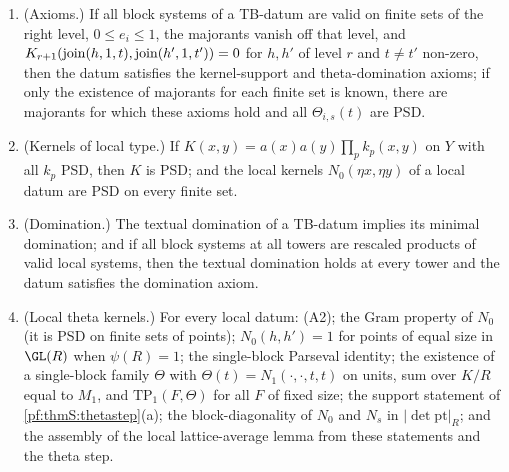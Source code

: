 \begin{theorem}
\begin{enumerate}[label=(LI\arabic*)]
$F$, then one majorant, vanishing outside $A\times A$ and PSD everywhere, makes it valid on every finite subset of $A$.
\item\label{pf:thmS:LI10} (Axioms.) If all block systems of a TB-datum are valid on finite sets of the right level, $0\le e_i\le1$,
the majorants vanish off that level, and $K_{r+1}(\operatorname{join}(h,1,t),\operatorname{join}(h',1,t'))=0$ for $h,h'$ of level $r$ and $t\ne t'$
non-zero, then the datum satisfies the kernel-support and theta-domination axioms; if only the existence of majorants for each
finite set is known, there are majorants for which these axioms hold and all $\Theta_{i,s}(t)$ are PSD.
\item\label{pf:thmS:LI11} (Kernels of local type.) If $K(x,y)=a(x)a(y)\prod_pk_p(x,y)$ on $Y$ with all $k_p$ PSD, then $K$ is PSD;
and the local kernels $N_0(\eta x,\eta y)$ of a local datum are PSD on every finite set.
\item\label{pf:thmS:LI12} (Domination.) The textual domination of a TB-datum implies its minimal domination; and if all block
systems at all towers are rescaled products of valid local systems, then the textual domination holds at every tower and the
datum satisfies the domination axiom.
\item\label{pf:thmS:LI13} (Local theta kernels.) For every local datum: (A2); the Gram property of $N_0$ (it is PSD on finite sets of
points); $N_0(h,h')=1$ for points of equal size in $\GL(R)$ when $\psi(R)=1$; the single-block Parseval identity; the existence of
a single-block family $\Theta$ with $\Theta(t)=N_1(\cdot,\cdot,t,t)$ on units, sum over $K/R$ equal to $M_1$, and
$\mathrm{TP}_1(F,\Theta)$ for all $F$ of fixed size; the support statement of \cref{pf:thmS:thetastep}(a); the block-diagonality
of $N_0$ and $N_s$ in $|\det\mathrm{pt}|_R$; and the assembly of the local lattice-average lemma from these statements and the
theta step.
\end{enumerate}
\end{theorem}

